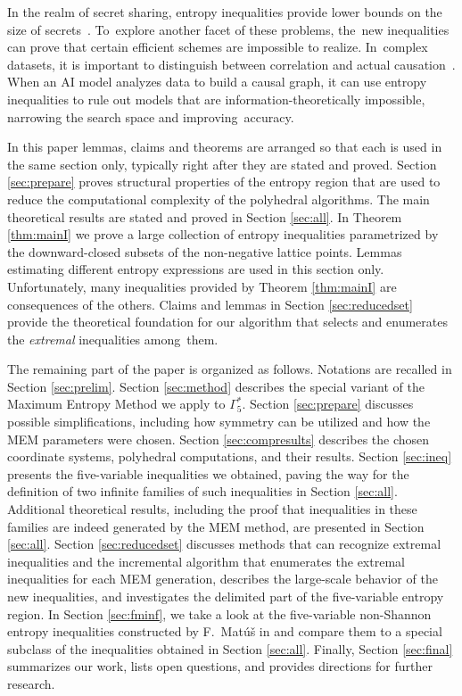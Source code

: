 \documentclass[reqno]{amsart}
\theoremstyle{definition}
\def\Ga#1{\Gamma^*_{\!#1}}
\begin{document}
In the realm of secret sharing, entropy inequalities provide lower bounds on
the size of secrets~\cite{Beimel,Beimel.Orlov,G.Rom}. To~explore another
facet of these problems, the~new inequalities can prove that certain
efficient schemes are impossible to realize. In~complex datasets, it is
important to distinguish between correlation and actual
causation~\cite{casual}. When an AI model analyzes data to build a causal
graph, it can use entropy inequalities to rule out models that are
information-theoretically impossible, narrowing the search space and
improving~accuracy.

In this paper lemmas, claims and theorems are arranged so that each is used
in the same section only, typically right after they are stated and proved.
Section \ref{sec:prepare} proves structural properties of the entropy region
that are used to reduce the computational complexity of the polyhedral
algorithms. The main theoretical results are stated and proved in Section
\ref{sec:all}. In Theorem \ref{thm:mainI} we prove a large collection of
entropy inequalities parametrized by the downward-closed subsets of the
non-negative lattice points. Lemmas estimating different entropy expressions
are used in this section only. Unfortunately, many inequalities provided by
Theorem \ref{thm:mainI} are consequences of the others. Claims and lemmas in
Section \ref{sec:reducedset} provide the theoretical foundation for our
algorithm that selects and enumerates the \emph{extremal} inequalities
among~them.

\smallskip

The remaining part of the paper is organized as follows. Notations are
recalled in Section \ref{sec:prelim}. Section \ref{sec:method} describes the
special variant of the Maximum Entropy Method we apply to $\Ga5$. Section
\ref{sec:prepare} discusses possible simplifications, including how symmetry
can be utilized and how the MEM parameters were chosen. Section
\ref{sec:compresults} describes the chosen coordinate systems, polyhedral
computations, and their results. Section \ref{sec:ineq} presents the
five-variable inequalities we obtained, paving the way for the definition of
two infinite families of such inequalities in Section \ref{sec:all}.
Additional theoretical results, including the proof that inequalities in
these families are indeed generated by the MEM method, are presented in
Section \ref{sec:all}. Section \ref{sec:reducedset} discusses methods that
can recognize extremal inequalities and the incremental algorithm that
enumerates the extremal inequalities for each MEM generation, describes the
large-scale behavior of the new inequalities, and investigates the delimited
part of the five-variable entropy region. In Section \ref{sec:fminf},  we take
a look at the five-variable non-Shannon entropy inequalities constructed by
F.~Mat\'u\v s in \cite{M.infinf} and compare them to a special subclass of
the inequalities obtained in Section \ref{sec:all}. Finally, Section
\ref{sec:final} summarizes our work, lists open questions, and provides
directions for further research.
 
\end{document}

